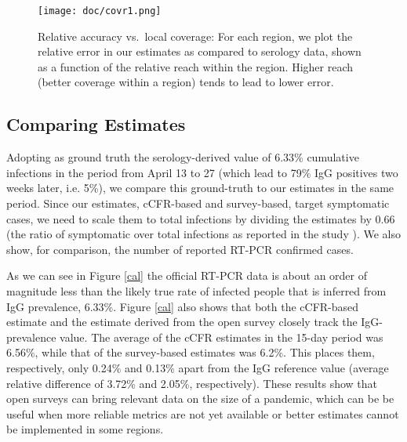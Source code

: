\documentclass[sigconf,authordraft]{acmart}
\begin{document}
\begin{figure}[htb]
\begin{center}
\texttt{[image: doc/covr1.png]}
\end{center}
\caption{Relative accuracy vs.~local coverage: For each region, we plot the relative error in our estimates as compared to serology data, shown as a function of the relative reach within the region. Higher reach (better coverage within a region) tends to lead to lower error. }
\label{fig:coverage-vs-accuracy}
\end{figure}

\subsection{Comparing Estimates}
\label{s-comparison}

Adopting as ground truth the serology-derived value of 6.33\% cumulative infections in the period from April 13 to 27 (which lead to 79\% IgG positives two weeks later, i.e. 5\%), we compare this ground-truth to our estimates in the same period. Since our estimates, cCFR-based and survey-based, target symptomatic cases, we need to scale them to total infections by dividing the estimates by 0.66 (the ratio of symptomatic over total infections as reported in the study \cite{ENEcovid19}). We also show, for comparison, the number of reported RT-PCR confirmed cases.

As we can see in Figure \ref{cal} the official RT-PCR data is about an order of magnitude less than the likely true rate of infected people that is inferred from IgG prevalence, 6.33\%. Figure \ref{cal} also shows that both the cCFR-based estimate and the estimate derived from the open survey closely track the IgG-prevalence value. 
% 
The average of the cCFR estimates in the 15-day period was 6.56\%, while that of the survey-based estimates was 6.2\%. This places them, respectively, only 0.24\% and 0.13\% apart from the IgG reference value (average relative difference of 3.72\% and 2.05\%, respectively). These results show that open surveys can bring relevant data on the size of a pandemic, which can be be useful when more reliable metrics are not yet available or better estimates cannot be implemented in some regions. 
\end{document}
